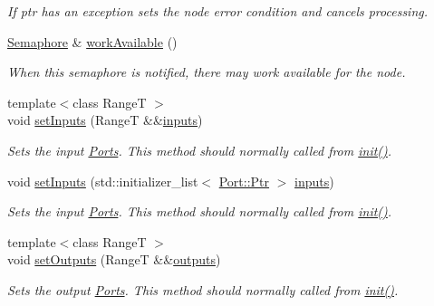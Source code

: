 \begin{DoxyCompactItemize}
\begin{DoxyCompactList}\small\item\em If {\ttfamily ptr} has an exception sets the node error condition and cancels processing. \end{DoxyCompactList}\item 
\hyperlink{classdg_1_1deepcore_1_1_semaphore}{Semaphore} \& \hyperlink{classdg_1_1deepcore_1_1_node_a8330c5614e67cb467e47aec393545d7e}{work\+Available} ()
\begin{DoxyCompactList}\small\item\em When this semaphore is notified, there may work available for the node. \end{DoxyCompactList}\item 
{\footnotesize template$<$class RangeT $>$ }\\void \hyperlink{classdg_1_1deepcore_1_1_node_a23edc019ecfa40357fddf55861ec2092}{set\+Inputs} (RangeT \&\&\hyperlink{classdg_1_1deepcore_1_1_node_a1e89da6fe3941b07685f0f57e6d2a4c6}{inputs})
\begin{DoxyCompactList}\small\item\em Sets the input \hyperlink{classdg_1_1deepcore_1_1_port}{Ports}. This method should normally called from \hyperlink{classdg_1_1deepcore_1_1_object_a0982aef61087daaf910acfe8b6dcac99}{init()}. \end{DoxyCompactList}\item 
void \hyperlink{classdg_1_1deepcore_1_1_node_a872d614754903c93c166691234083147}{set\+Inputs} (std\+::initializer\+\_\+list$<$ \hyperlink{classdg_1_1deepcore_1_1_object_a4565c5c2ba828aaaa4354befbac8b2f9}{Port\+::\+Ptr} $>$ \hyperlink{classdg_1_1deepcore_1_1_node_a1e89da6fe3941b07685f0f57e6d2a4c6}{inputs})
\begin{DoxyCompactList}\small\item\em Sets the input \hyperlink{classdg_1_1deepcore_1_1_port}{Ports}. This method should normally called from \hyperlink{classdg_1_1deepcore_1_1_object_a0982aef61087daaf910acfe8b6dcac99}{init()}. \end{DoxyCompactList}\item 
{\footnotesize template$<$class RangeT $>$ }\\void \hyperlink{classdg_1_1deepcore_1_1_node_aac67a930b471ada2d1038965a59f17f3}{set\+Outputs} (RangeT \&\&\hyperlink{classdg_1_1deepcore_1_1_node_a81cc04114467cd4724c05dfa3d1e975c}{outputs})
\begin{DoxyCompactList}\small\item\em Sets the output \hyperlink{classdg_1_1deepcore_1_1_port}{Ports}. This method should normally called from \hyperlink{classdg_1_1deepcore_1_1_object_a0982aef61087daaf910acfe8b6dcac99}{init()}. \end{DoxyCompactList}\item 

\end{DoxyCompactItemize}
